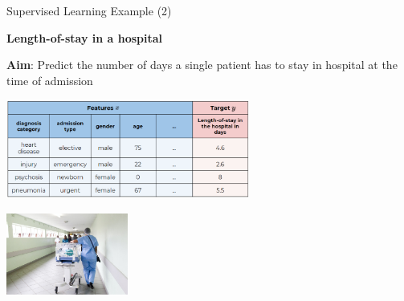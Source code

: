 \documentclass[11pt,compress,t,notes=noshow, xcolor=table]{beamer}
\begin{document}
\begin{vbframe}{Supervised Learning Example (2)}

  
  \textbf{Length-of-stay in a hospital}
  
  \textbf{Aim}: Predict the number of days a single patient has to stay 
    in hospital at the time of admission\\[-1ex]
       
    \lz
    
    \begin{center}
    \includegraphics[width=0.6\textwidth]{figure_man/ml-basics-supervised-task-hosp-data.png} 
    
    \lz
    
    \includegraphics[width=0.3\textwidth]{figure_man/ml-basics-supervised-task-hosp-pic.jpg} 
    
    \end{center}
    
  
  

\end{vbframe}

\end{document}
